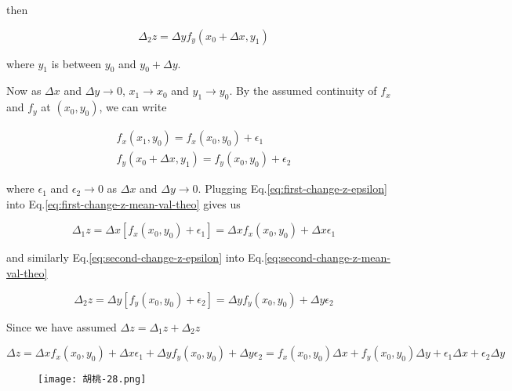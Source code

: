 then

\begin{equation}\label{eq:second-change-z-mean-val-theo}
\Delta_2 z = \Delta y f_y(x_0 + \Delta x, y_1)
\end{equation}

where $y_1$ is between $y_0$ and $y_0 + \Delta y$.

Now as $\Delta x$ and $\Delta y \rightarrow 0$, $x_1 \rightarrow x_0$ and $y_1 \rightarrow y_0$. By the assumed
continuity of $f_x$ and $f_y$ at $(x_0, y_0)$, we can write

\begin{align}
    f_x(x_1, y_0) = f_x(x_0, y_0) + \epsilon_1 \label{eq:first-change-z-epsilon} \\
    f_y(x_0 + \Delta x, y_1) = f_y(x_0, y_0) + \epsilon_2 \label{eq:second-change-z-epsilon}
\end{align}

where $\epsilon_1$ and $\epsilon_2 \rightarrow 0$ as $\Delta x$ and $\Delta y \rightarrow 0$. Plugging
Eq.\ref{eq:first-change-z-epsilon} into Eq.\ref{eq:first-change-z-mean-val-theo} gives us

\begin{equation}
    \Delta_1 z = \Delta x\left[ f_x(x_0, y_0) + \epsilon_1 \right] = \Delta x f_x(x_0, y_0) + \Delta x\epsilon_1
\end{equation}

and similarly Eq.\ref{eq:second-change-z-epsilon} into Eq.\ref{eq:second-change-z-mean-val-theo}

\begin{equation}
    \Delta_2 z = \Delta y\left[ f_y(x_0, y_0) + \epsilon_2 \right] = \Delta y f_y(x_0, y_0) + \Delta y\epsilon_2
\end{equation}

Since we have assumed $\Delta z = \Delta_1 z + \Delta_2 z$

\begin{equation}
    \Delta z = \Delta x f_x(x_0, y_0) + \Delta x\epsilon_1 + \Delta y f_y(x_0, y_0) + \Delta y\epsilon_2 = f_x(x_0, y_0)\Delta x + f_y(x_0, y_0)\Delta y + \epsilon_1\Delta x + \epsilon_2\Delta y
\end{equation}

\begin{figure}[H]
    \begin{flushright}
        \texttt{[image: 胡桃-28.png]}
    \end{flushright}
\end{figure}

